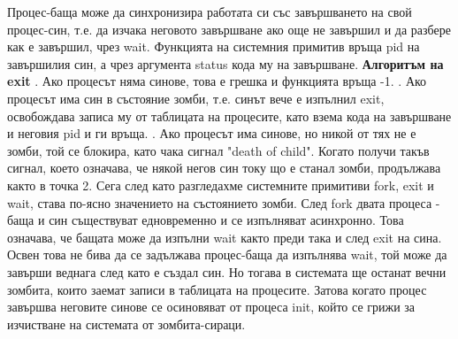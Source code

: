\documentclass{article}
\begin{document}
Процес-баща може да синхронизира работата си със завършването на свой процес-син, т.е. да изчака неговото завършване ако още не
завършил и да разбере как е завършил, чрез wait. Функцията на системния примитив връща pid на завършилия син, а чрез аргумента
status кода му на завършване. \newline
\textbf{Алгоритъм на exit} \newline{}. Ако процесът няма синове, това е грешка и функцията връща -1. . Ако процесът има син в състояние зомби, т.е. синът вече е изпълнил exit, освобождава записа му от таблицата на процесите,
като взема кода на завършване и неговия pid и ги връща. . Ако процесът има синове, но никой от тях не е зомби, той се блокира, като чака сигнал "death of child". Когато получи такъв
сигнал, което означава, че някой негов син току що е станал зомби, продължава както в точка 2. \newline
Сега след като разгледахме системните примитиви fork, exit и wait, става по-ясно значението на състоянието зомби. След fork двата
процеса - баща и син съществуват едновременно и се изпълняват асинхронно. Това означава, че бащата може да изпълни wait както
преди така и след exit на сина. Освен това не бива да се задължава процес-баща да изпълнява wait, той може да завърши веднага
след като е създал син. Но тогава в системата ще останат вечни зомбита, които заемат записи в таблицата на процесите. Затова
когато процес завършва неговите синове се осиновяват от процеса init, който се грижи за изчистване на системата от зомбита-сираци.
\end{document}
